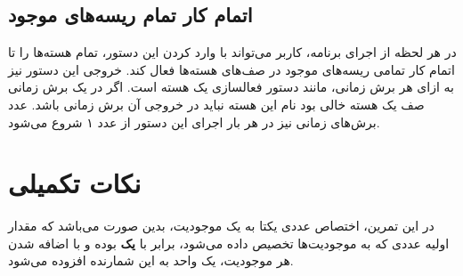 \documentclass{utap}
\begin{document}
	\subsection{اتمام کار تمام ریسه‌های موجود}
	\hspace{5mm}
	در هر لحظه از اجرای برنامه، کاربر می‌تواند با وارد کردن این دستور، تمام هسته‌ها را تا اتمام کار تمامی ریسه‌های موجود در صف‌ها‌ی هسته‌ها فعال کند.
	خروجی این دستور نیز به ازای هر برش زمانی، مانند دستور فعالسازی یک هسته است. اگر در یک برش زمانی صف یک هسته خالی بود نام این هسته نباید در خروجی آن برش زمانی باشد. عدد برش‌های زمانی نیز در هر بار اجرای این دستور از عدد ۱ شروع می‌شود.
	
	\linespread{1.6}
	\begin{latin}%
		\centering
		\begin{minipage}[t]{1\textwidth}
			{}
			{}
		\end{minipage}%
	\end{latin}
	
	\section{نکات تکمیلی}
	\hspace{5mm}
	در این تمرین، اختصاص عددی یکتا به یک موجودیت‌،‌ بدین صورت می‌باشد که مقدار اولیه عددی که به موجودیت‌ها تخصیص داده می‌شود، برابر با \textbf{یک} بوده و با اضافه شدن هر موجودیت، یک واحد به این شمارنده افزوده می‌شود.
	
\end{document}
